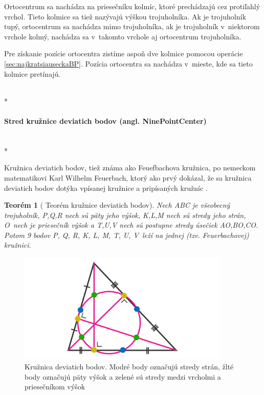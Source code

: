 Ortocentrum sa nachádza na priesečníku kolmíc, ktoré prechádzajú cez protiľahlý vrchol. Tieto kolmice sa tiež nazývajú výškou trojuholníka. 
Ak je trojuholník tupý, ortocentrum sa nachádza mimo trojuholníka, ak je trojuholník v~niektorom vrchole kolmý, nachádza sa v~takomto vrchole aj ortocentrum trojuholníka.

Pre získanie pozície ortocentra zistíme aspoň dve kolmice pomocou operácie \ref{sec:najkratsiauseckaBP}. Pozícia ortocentra sa nachádza v~mieste, kde sa tieto kolmice pretínajú. 


 \mbox{} \\*
\paragraph{Stred kružnice deviatich bodov (angl. NinePointCenter)}\unskip \mbox{} \\*

Kružnica deviatich bodov, tiež známa ako Feuefbachova kružnica, po nemeckom matematikovi Karl Wilhelm Feuerbach, ktorý ako prvý dokázal, že sa kružnica deviatich bodov dotýka vpísanej kružnice a pripísaných kružníc \cite{NinePointTheorem}.


\newtheorem{theorem}{Teorém}
 
\begin{theorem}[{\cite{vyznamne_prvky_trojuholnika} Teorém kružnice deviatich bodov}]
Nech ABC je všeobecný trojuholník, P,Q,R nech sú päty jeho výšok, K,L,M nech sú stredy jeho strán, O~nech je priesečník výšok a T,U,V nech sú postupne stredy úsečiek AO,BO,CO. Potom 9 bodov P, Q, R, K, L, M, T, U, V~leží na jednej (tzv. Feuerbachovej) kružnici. 

\end{theorem}


\begin{figure}[H]
	\centering
	\includegraphics[width=0.9\textwidth]{obrazky-figures/NinePointCircle.png}
	\caption{Kružnica deviatich bodov. Modré body označujú stredy strán, žlté body označujú päty výšok a zelené sú stredy medzi vrcholmi a priesečníkom výšok\cite{katz_prakash_khim}}
	\label{fig:TriangleCenters_ninePoints}
\end{figure}



